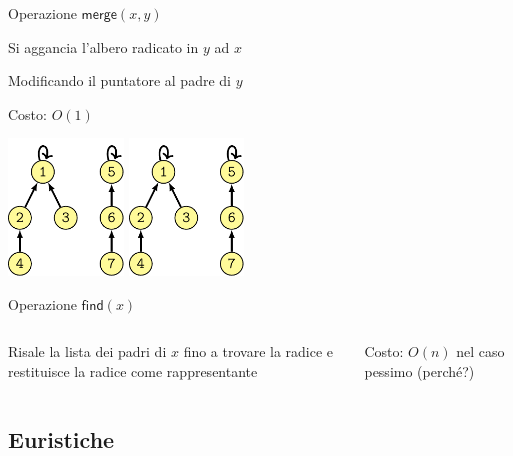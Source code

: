 \begin{frame}{Operazione $\textsf{merge}(x,y)$}

\BIL
\item Si aggancia l'albero radicato in $y$ ad $x$
\item Modificando il puntatore al padre di $y$
\item Costo: $O(1)$
\EIL

\bigskip\centering
\includegraphics[width=0.23\textwidth,page=1,valign=t]{mfset-alberi.pdf}
\qquad{\huge $\Rightarrow$}\quad
\includegraphics[width=0.23\textwidth,page=2,valign=t]{mfset-alberi.pdf}




\end{frame}

\begin{frame}{Operazione $\textsf{find}(x)$}

\begin{columns}[T]
\BIL
\item Risale la lista dei padri di $x$ fino a trovare la radice e 
restituisce la radice come rappresentante
\item Costo: $O(n)$ nel caso pessimo (perché?)
\EIL
{}
\vspace{-9pt}
\end{columns}

\end{frame}

\subsection{Euristiche}

